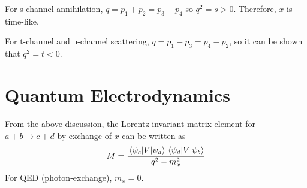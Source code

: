 \documentclass[a4paper,twoside,master.tex]{subfiles}
\begin{document}
For s-channel annihilation, $ q = p_1 + p_2 = p_3 + p_4 $ so $ q^2 = s > 0 $. Therefore, $ x $ is time-like.

For t-channel and u-channel scattering, $ q = p_1 - p_3 = p_4 - p_2 $, so it can be shown that $ q^2 = t < 0 $.

\section{Quantum Electrodynamics}\label{sec:quantum_electrodynamics}

From the above discussion, the Lorentz-invariant matrix element for $ a + b \to c + d $ by exchange of $ x $ can be written as
\begin{equation}
    M = \frac{\mel{\psi_c}{V}{\psi_a} \mel{\psi_d}{V}{\psi_b}}{q^2 - m_x^2}
\end{equation}
For QED (photon-exchange), $ m_x = 0 $.
\end{document}
